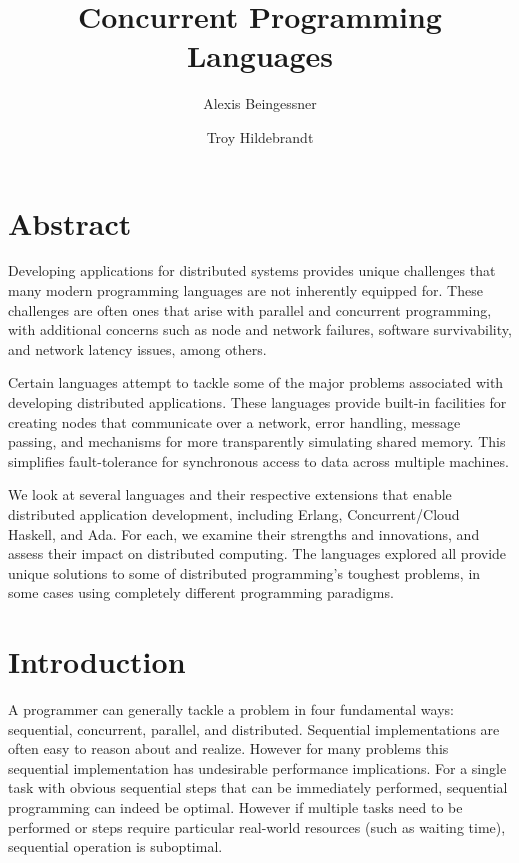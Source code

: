 \documentclass[10pt,a4paper,twocolumn]{article}
\begin{document}
\title{Concurrent Programming Languages}

\author{
Alexis Beingessner
\and
Troy Hildebrandt
}

\maketitle

\section{Abstract}

Developing applications for distributed systems provides unique challenges that
many modern programming languages are not inherently equipped for. These
challenges are often ones that arise with parallel and concurrent programming,
with additional concerns such as node and network failures, software
survivability, and network latency issues, among others.

Certain languages attempt to tackle some of the major problems associated with
developing distributed applications. These languages provide built-in facilities
for creating nodes that communicate over a network, error handling, message
passing, and mechanisms for more transparently simulating shared memory. This
simplifies fault-tolerance for synchronous access to data across multiple
machines.

We look at several languages and their respective extensions that enable
distributed application development, including Erlang, Concurrent/Cloud Haskell,
and Ada. For each, we examine their strengths and innovations, and assess their
impact on distributed computing. The languages explored all provide unique
solutions to some of distributed programming's toughest problems, in some cases
using completely different programming paradigms.

\section{Introduction}

A programmer can generally tackle a problem in four fundamental ways:
sequential, concurrent, parallel, and distributed. Sequential implementations
are often easy to reason about and realize. However for many problems this
sequential implementation has undesirable performance implications. For a
single task with obvious sequential steps that can be immediately performed,
sequential programming can indeed be optimal. However if multiple tasks need to
be performed or steps require particular real-world resources (such as waiting
time), sequential operation is suboptimal.
\end{document}
